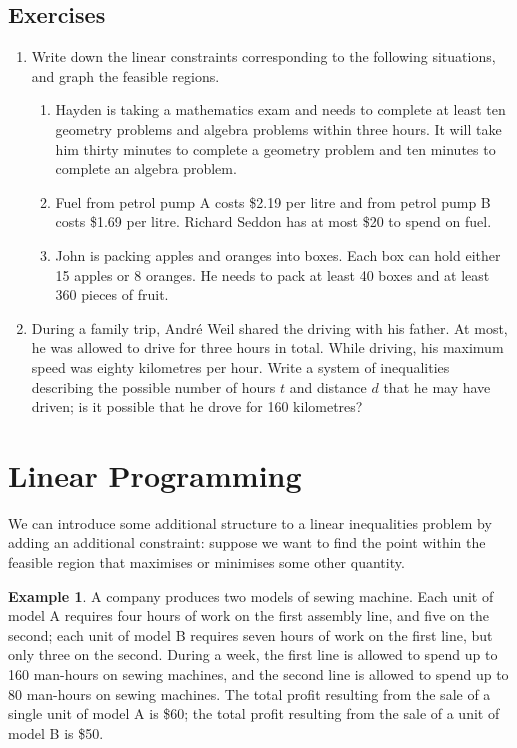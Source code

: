 \documentclass[a4paper,leqno]{article}
\numberwithin{equation}{section}
\theoremstyle{definition}
\newtheorem{ex}[equation]{Example}
\theoremstyle{remark}
\begin{document}
\subsection*{Exercises}
\begin{enumerate}
  \item Write down the linear constraints corresponding to the following situations, and graph the feasible regions.
    \begin{enumerate}
      \item Hayden is taking a mathematics exam and needs to complete at least ten geometry problems and algebra problems within three hours. It
            will take him thirty minutes to complete a geometry problem and ten minutes to complete an algebra problem.
      \item Fuel from petrol pump A costs \$2.19 per litre and from petrol pump B costs \$1.69 per litre. Richard Seddon has at most \$20 to spend on fuel.
      \item John is packing apples and oranges into boxes. Each box can hold either 15 apples or 8 oranges. He needs to pack at least 40 boxes and
            at least 360 pieces of fruit.
    \end{enumerate}
  \item During a family trip, Andr\'e Weil shared the driving with his father. At most, he was allowed to drive for three hours in total. While driving, his
        maximum speed was eighty kilometres per hour. Write a system of inequalities describing the possible number of hours $ t $ and distance $ d $ that
        he may have driven; is it possible that he drove for 160 kilometres?
\end{enumerate}

\section{Linear Programming}
We can introduce some additional structure to a linear inequalities problem by adding an additional constraint: suppose we want to find the point
within the feasible region that maximises or minimises some other quantity.

\begin{ex}
  A company produces two models of sewing machine. Each unit of model A requires four hours of work on the first assembly line, and five on
  the second; each unit of model B requires seven hours of work on the first line, but only three on the second. During a week, the first line
  is allowed to spend up to 160 man-hours on sewing machines, and the second line is allowed to spend up to 80 man-hours on sewing machines. The
  total profit resulting from the sale of a single unit of model A is \$60; the total profit resulting from the sale of a unit of model B is \$50.
\end{ex}
\end{document}
